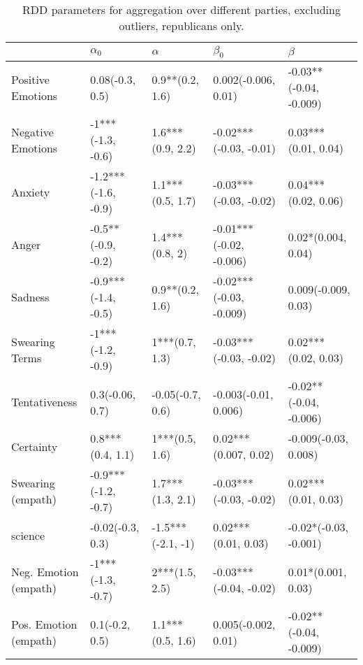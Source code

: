 \begin{table}[h]\centering
\begin{adjustbox}{width=\linewidth, center}
	\begin{tabular}{lllll}
	\toprule
	{} &           $\alpha_0$ &           $\alpha$ &                $\beta_0$ &                 $\beta$ \\
	\midrule
	Positive Emotions     &      0.08(-0.3, 0.5) &    0.9**(0.2, 1.6) &      0.002(-0.006, 0.01) &  -0.03**(-0.04, -0.009) \\
	Negative Emotions     &    -1***(-1.3, -0.6) &   1.6***(0.9, 2.2) &   -0.02***(-0.03, -0.01) &     0.03***(0.01, 0.04) \\
	Anxiety               &  -1.2***(-1.6, -0.9) &   1.1***(0.5, 1.7) &   -0.03***(-0.03, -0.02) &     0.04***(0.02, 0.06) \\
	Anger                 &   -0.5**(-0.9, -0.2) &     1.4***(0.8, 2) &  -0.01***(-0.02, -0.006) &      0.02*(0.004, 0.04) \\
	Sadness               &  -0.9***(-1.4, -0.5) &    0.9**(0.2, 1.6) &  -0.02***(-0.03, -0.009) &     0.009(-0.009, 0.03) \\
	Swearing Terms        &    -1***(-1.2, -0.9) &     1***(0.7, 1.3) &   -0.03***(-0.03, -0.02) &     0.02***(0.02, 0.03) \\
	Tentativeness         &      0.3(-0.06, 0.7) &   -0.05(-0.7, 0.6) &     -0.003(-0.01, 0.006) &  -0.02**(-0.04, -0.006) \\
	Certainty             &     0.8***(0.4, 1.1) &     1***(0.5, 1.6) &     0.02***(0.007, 0.02) &    -0.009(-0.03, 0.008) \\
	Swearing (empath)     &  -0.9***(-1.2, -0.7) &   1.7***(1.3, 2.1) &   -0.03***(-0.03, -0.02) &     0.02***(0.01, 0.03) \\
	science               &     -0.02(-0.3, 0.3) &  -1.5***(-2.1, -1) &      0.02***(0.01, 0.03) &   -0.02*(-0.03, -0.001) \\
	Neg. Emotion (empath) &    -1***(-1.3, -0.7) &     2***(1.5, 2.5) &   -0.03***(-0.04, -0.02) &      0.01*(0.001, 0.03) \\
	Pos. Emotion (empath) &       0.1(-0.2, 0.5) &   1.1***(0.5, 1.6) &      0.005(-0.002, 0.01) &  -0.02**(-0.04, -0.009) \\
	\bottomrule
	\end{tabular}
	
\end{adjustbox}
	\caption{RDD parameters for aggregation over different parties, excluding outliers, republicans only.}
	\label{fig: Party_4}
\end{table}

